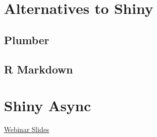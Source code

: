 \documentclass[]{book}
\begin{document}
\hypertarget{alternatives-to-shiny}{%
\chapter{Alternatives to Shiny}\label{alternatives-to-shiny}}

\hypertarget{plumber}{%
\section{Plumber}\label{plumber}}

\hypertarget{r-markdown}{%
\section{R Markdown}\label{r-markdown}}

\hypertarget{shiny-async}{%
\chapter{Shiny Async}\label{shiny-async}}

\href{https://github.com/rstudio/webinars/blob/master/56-scaling-shiny-apps/Scaling\%20Shiny\%20apps\%20with\%20async\%20programming.pdf}{Webinar
Slides}
\end{document}
